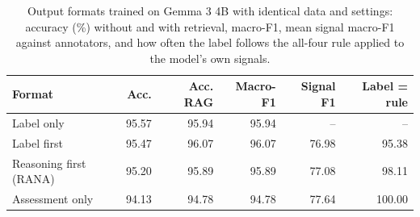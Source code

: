 \begin{table}[t]
\renewcommand{\tblwidth}{\textwidth}%
\small
\centering
\caption{Output formats trained on Gemma 3 4B with identical data and settings: accuracy (\%) without and with retrieval, macro-F1, mean signal macro-F1 against annotators, and how often the label follows the all-four rule applied to the model's own signals.}\label{tbl_factorial}
\begin{tabular*}{\tblwidth}{@{\extracolsep{\fill}}LRRRRR@{}}
\toprule
\textbf{Format} & \textbf{Acc.} & \textbf{Acc. RAG} & \textbf{Macro-F1} & \textbf{Signal F1} & \textbf{Label = rule} \\
\midrule
Label only & 95.57 & 95.94 & 95.94 & -- & -- \\
Label first & 95.47 & 96.07 & 96.07 & 76.98 & 95.38 \\
Reasoning first (RANA) & 95.20 & 95.89 & 95.89 & 77.08 & 98.11 \\
Assessment only & 94.13 & 94.78 & 94.78 & 77.64 & 100.00 \\
\bottomrule
\end{tabular*}
\end{table}

